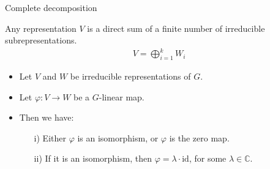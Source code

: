 \documentclass[10pt]{beamer}
\newcommand{\id}{\text{id}}
\newcommand{\CC}{\mathbb{C}}
\begin{document}
	\begin{frame}{Complete decomposition}
		\begin{corollary}
			Any representation $V$ is a direct sum of a finite number of irreducible subrepresentations. \begin{align*}
				V = \bigoplus_{i=1}^k W_i
			\end{align*}
		\end{corollary}\pause
%				
%				
				
		\begin{theorem}
			\begin{itemize}
				\item Let $V$ and $W$ be irreducible representations of $G$.
				\item Let $\varphi: V \rightarrow W$ be a $G$-linear map.\pause
				\item Then we have: 
				\begin{itemize}
					\item[i)] Either $\varphi$ is an isomorphism, or $\varphi$ is the zero map.\pause
					\item[ii)] If it is an isomorphism, then $\varphi = \lambda \cdot \id$, for some $\lambda \in \CC$.
				\end{itemize}
				
			\end{itemize}
		\end{theorem}
	\end{frame}
\end{document}
